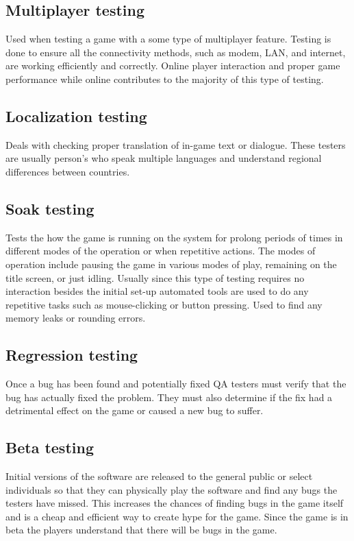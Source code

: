 \subsection{Multiplayer testing} Used when testing a game with a some type of multiplayer feature. Testing is done to ensure all the connectivity methods, such as modem, LAN, and internet, are working efficiently and correctly. Online player interaction and proper game performance while online contributes to the majority of this type of testing.

\subsection{Localization testing} Deals with checking proper translation of in-game text or dialogue. These testers are usually person's who speak multiple languages and understand regional differences between countries.

\subsection{Soak testing} Tests the how the game is running on the system for prolong periods of times in different modes of the operation or when repetitive actions. The modes of operation include pausing the game in various modes of play, remaining on the title screen, or just idling. Usually since this type of testing requires no interaction besides the initial set-up automated tools are used to do any repetitive tasks such as mouse-clicking or button pressing. Used to find any memory leaks or rounding errors.

\subsection{Regression testing} Once a bug has been found and potentially fixed QA testers must verify that the bug has actually fixed the problem. They must also determine if the fix had a detrimental effect on the game or caused a new bug to suffer.

\subsection{Beta testing} Initial versions of the software are released to the general public or select individuals so that they can physically play the software and find any bugs the testers have missed. This increases the chances of finding bugs in the game itself and is a cheap and efficient way to create hype for the game. Since the game is in beta the players understand that there will be bugs in the game.

